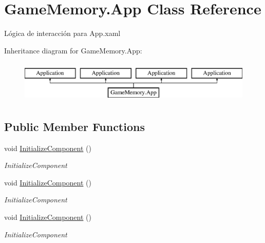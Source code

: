 \hypertarget{class_game_memory_1_1_app}{\section{Game\-Memory.\-App Class Reference}
\label{class_game_memory_1_1_app}
}


Lógica de interacción para App.\-xaml  


Inheritance diagram for Game\-Memory.\-App\-:\begin{figure}[H]
\begin{center}
\leavevmode
\includegraphics[height=2.000000cm]{class_game_memory_1_1_app}
\end{center}
\end{figure}
\subsection*{Public Member Functions}
\begin{DoxyCompactItemize}
\item 
void \hyperlink{class_game_memory_1_1_app_a8cd0811afa0643c63fdf78ec2450ec10}{Initialize\-Component} ()
\begin{DoxyCompactList}\small\item\em Initialize\-Component \end{DoxyCompactList}\item 
void \hyperlink{class_game_memory_1_1_app_a8cd0811afa0643c63fdf78ec2450ec10}{Initialize\-Component} ()
\begin{DoxyCompactList}\small\item\em Initialize\-Component \end{DoxyCompactList}\item 
void \hyperlink{class_game_memory_1_1_app_a8cd0811afa0643c63fdf78ec2450ec10}{Initialize\-Component} ()
\begin{DoxyCompactList}\small\item\em Initialize\-Component \end{DoxyCompactList}\end{DoxyCompactItemize}
